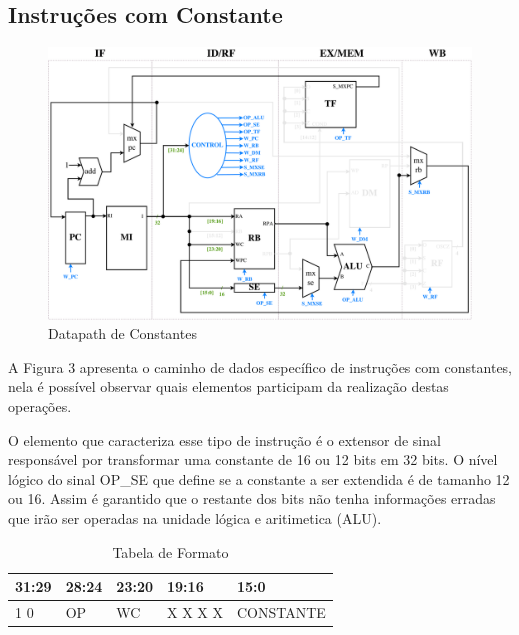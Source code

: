 \documentclass{report}
\begin{document}
\subsection{Instruções com Constante}
\begin{figure}[H]
\centering
\includegraphics[width=\textwidth]{./pictures/DatapathCONS.pdf}
\caption{Datapath de Constantes}
\end{figure}
A Figura 3 apresenta o caminho de dados específico de instruções com constantes, nela é possível observar quais elementos participam da realização destas operações.\newline

O elemento que caracteriza esse tipo de instrução é o extensor de sinal responsável por transformar uma constante de 16 ou 12 bits em 32 bits. O nível lógico do sinal OP\_SE que define se a constante a ser extendida é de tamanho 12 ou 16. Assim é garantido que o restante dos bits não tenha informações erradas que irão ser operadas na unidade lógica e aritimetica (ALU).

\FloatBarrier
\begin{table}[H]
  \begin{center}
  \renewcommand{\arraystretch}{1.2}
    \begin{tabular}[pos]{|>{\centering\arraybackslash}m{35pt}|>{\centering\arraybackslash}m{57pt}|>{\centering\arraybackslash}m{46pt}|>{\centering\arraybackslash}m{46pt}|>{\centering\arraybackslash}m{181pt}|} \hline
      \cellcolor[gray]{0.9}\textbf{31:29} & \cellcolor[gray]{0.9}\textbf{28:24} & \cellcolor[gray]{0.9}\textbf{23:20} & \cellcolor[gray]{0.9}\textbf{19:16} & \cellcolor[gray]{0.9}\textbf{15:0} \\ \hline
        0 1 0       & OP        & WC        & X X X X       & CONSTANTE \\ \hline
    \end{tabular}
    \caption{Tabela de Formato}
  \end{center}
\end{table}  
\end{document}
